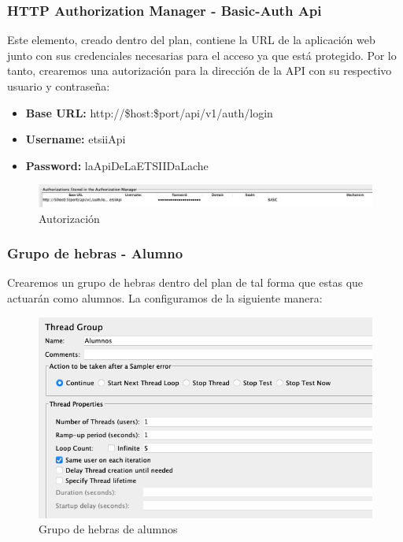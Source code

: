 \subsubsection{HTTP Authorization Manager - Basic-Auth Api}
Este elemento, creado dentro del plan, contiene la URL de la aplicación web junto con sus credenciales necesarias para el acceso ya que está protegido. Por lo tanto,
crearemos una autorización para la dirección de la API con su respectivo usuario y contraseña:
\begin{itemize}
    \item \textbf{Base URL:} http://\${host}:\${port}/api/v1/auth/login
    \item \textbf{Username:} etsiiApi
    \item \textbf{Password:} laApiDeLaETSIIDaLache
\end{itemize}

\begin{figure}[H]
    \centering
    \includegraphics[scale=0.4]{images/autorizacion.png}
    \caption{Autorización}
    \label{fig:autorizacion}
\end{figure}

\subsubsection{Grupo de hebras - Alumno}
Crearemos un grupo de hebras dentro del plan de tal forma que estas que actuarán como alumnos. La configuramos de la siguiente manera:
\begin{figure}[H]
    \centering
    \includegraphics[scale=0.35]{images/hebras_alumnos.png}
    \caption{Grupo de hebras de alumnos}
    \label{fig:hebras_alumnos}
\end{figure}

